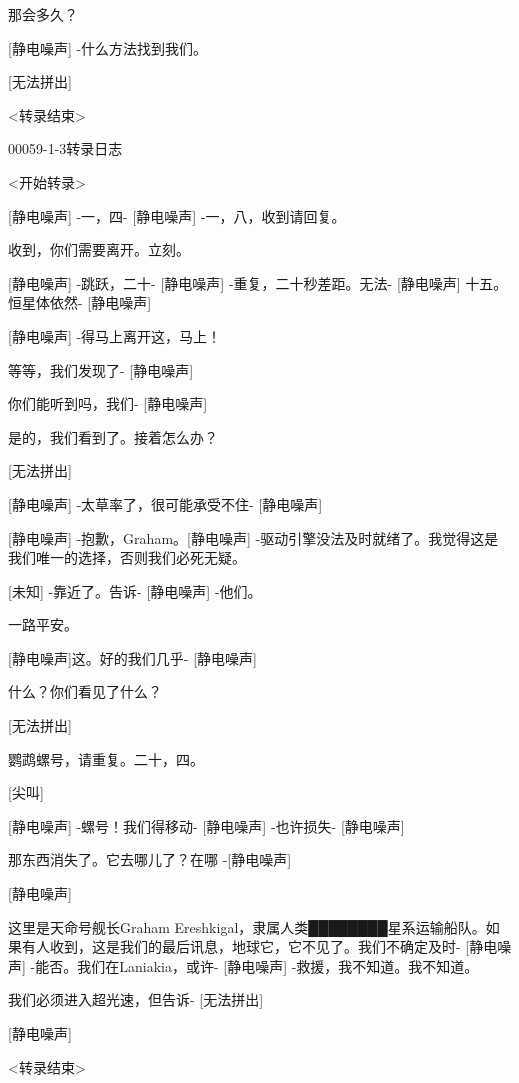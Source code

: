 \begin{scpbox}
 那会多久？

 {[}静电噪声] -什么方法找到我们。

 {[}无法拼出]

<转录结束>



00059-1-3转录日志


\hr

<开始转录>

 {[}静电噪声] -一，四- {[}静电噪声] -一，八，收到请回复。

 收到，你们需要离开。立刻。

 {[}静电噪声] -跳跃，二十- {[}静电噪声] -重复，二十秒差距。无法- {[}静电噪声] 十五。恒星体依然- {[}静电噪声]

 {[}静电噪声] -得马上离开这，马上！

 等等，我们发现了- {[}静电噪声]

 你们能听到吗，我们- {[}静电噪声]

 是的，我们看到了。接着怎么办？

 {[}无法拼出]

 {[}静电噪声] -太草率了，很可能承受不住- {[}静电噪声]

 {[}静电噪声] -抱歉，Graham。{[}静电噪声] -驱动引擎没法及时就绪了。我觉得这是我们唯一的选择，否则我们必死无疑。

 {[}未知] -靠近了。告诉- {[}静电噪声] -他们。

 一路平安。

 {[}静电噪声]这。好的我们几乎- {[}静电噪声]

 什么？你们看见了什么？

 {[}无法拼出]

 鹦鹉螺号，请重复。二十，四。

 {[}尖叫]

 {[}静电噪声] -螺号！我们得移动- {[}静电噪声] -也许损失- {[}静电噪声]

 那东西消失了。它去哪儿了？在哪 -{[}静电噪声]

 {[}静电噪声]

 这里是天命号舰长Graham Ereshkigal，隶属人类████████星系运输船队。如果有人收到，这是我们的最后讯息，地球它，它不见了。我们不确定及时- {[}静电噪声] -能否。我们在Laniakia，或许- {[}静电噪声] -救援，我不知道。我不知道。

 我们必须进入超光速，但告诉- {[}无法拼出] 

 {[}静电噪声]

<转录结束>

\end{scpbox}

